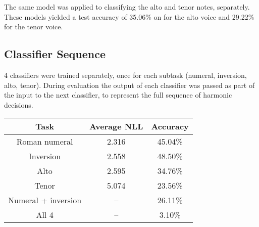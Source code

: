 \documentclass[12pt]{article}
\begin{document}
The same model was applied to classifying the alto and tenor notes, separately. These models yielded a test accuracy of 35.06\% on for the alto voice and 29.22\% for the tenor voice. 

\subsection{Classifier Sequence}

4 classifiers were trained separately, once for each subtask (numeral, inversion, alto, tenor). During evaluation the output of each classifier was passed as part of the input to the next classifier, to represent the full sequence of harmonic decisions.

\begin{center}
	\begin{tabular}{ c | c | c }
		\textbf{Task} & \textbf{Average NLL} & \textbf{Accuracy} \\ \hline
		Roman numeral & 2.316 & 45.04\% \\ \hline
		Inversion & 2.558 & 48.50\% \\ \hline
		Alto & 2.595 & 34.76\% \\ \hline
		Tenor & 5.074 & 23.56\% \\ \hline
		Numeral + inversion & -- & 26.11\% \\ \hline
		All 4 & -- & 3.10\%
	\end{tabular}
\end{center}
\end{document}
